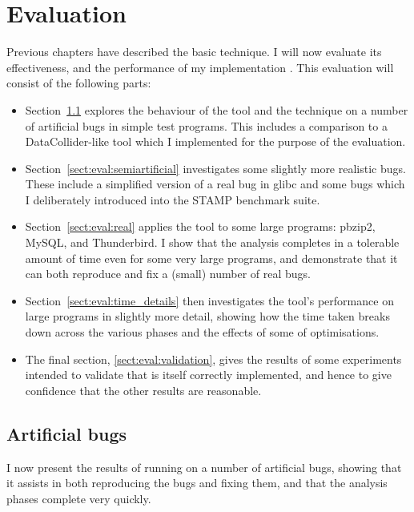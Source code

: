 \chapter{Evaluation}
\label{chapter:eval}

Previous chapters have described the basic {\technique} technique.  I
will now evaluate its effectiveness, and the performance of my
implementation {\implementation}.  This evaluation will consist of the
following parts:

\begin{itemize}
\item Section~\ref{sect:eval:artificial} explores the behaviour of the
  tool and the technique on a number of artificial bugs in simple test
  programs.  This includes a comparison to a
  DataCollider\needCite{}-like tool which I implemented for the
  purpose of the evaluation.
\item Section~\ref{sect:eval:semiartificial} investigates some
  slightly more realistic bugs.  These include a simplified version of
  a real bug in glibc\needCite{} and some bugs which I deliberately
  introduced into the STAMP benchmark suite\needCite{}.
\item Section~\ref{sect:eval:real} applies the tool to some large
  programs: pbzip2\needCite{}, MySQL\needCite{}, and
  Thunderbird\needCite{}.  I show that the analysis completes in a
  tolerable amount of time even for some very large programs,
  and demonstrate that it can both reproduce and fix a (small)
  number of real bugs.
\item Section~\ref{sect:eval:time_details} then investigates the
  tool's performance on large programs in slightly more detail,
  showing how the time taken breaks down across the various phases
  and the effects of some of {\implementation} optimisations.
\item The final section, \ref{sect:eval:validation}, gives the results
  of some experiments intended to validate that {\implementation} is
  itself correctly implemented, and hence to give confidence that the
  other results are reasonable.
\end{itemize}

\section{Artificial bugs}
\label{sect:eval:artificial}

I now present the results of running {\implementation} on a number of
artificial bugs, showing that it assists in both reproducing the bugs
and fixing them, and that the analysis phases complete very quickly.

